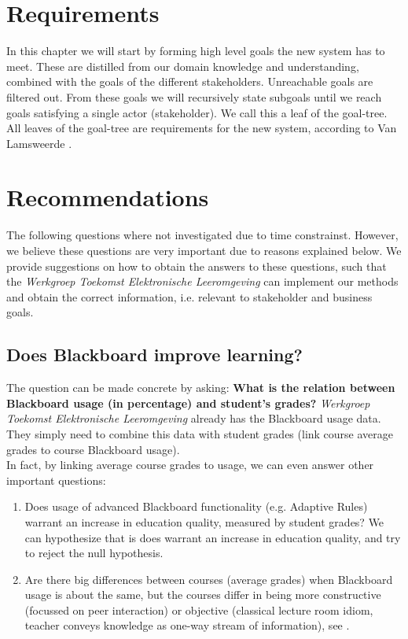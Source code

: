 \chapter{Requirements}
In this chapter we will start by forming high level goals the new system has to meet. These are distilled from our domain knowledge and understanding, combined with the goals of the different stakeholders. Unreachable goals are filtered out. From these goals we will recursively state subgoals until we reach goals satisfying a single actor (stakeholder). We call this a leaf of the goal-tree. All leaves of the goal-tree are requirements for the new system, according to Van Lamsweerde \cite{RE_book}.

\chapter{Recommendations}
The following questions where not investigated due to time constrainst. However, we believe these questions are very important due to reasons explained below. We provide suggestions on how to obtain the answers to these questions, such that the \textit{Werkgroep Toekomst Elektronische Leeromgeving} can implement our methods and obtain the correct information, i.e. relevant to stakeholder and business goals.

\section{Does Blackboard improve learning?}
The question can be made concrete by asking:\textbf{ What is the relation between Blackboard usage (in percentage) and student's grades?} \textit{Werkgroep Toekomst Elektronische Leeromgeving} already has the Blackboard usage data. They simply need to combine this data with student grades (link course average grades to course Blackboard usage). \\

In fact, by linking average course grades to usage, we can even answer other important questions:
\begin{enumerate}
	\item Does usage of advanced Blackboard functionality (e.g. Adaptive Rules) warrant an increase in education quality, measured by student grades? We can hypothesize that is does warrant an increase in education quality, and try to reject the null hypothesis.
	\item Are there big differences between courses (average grades) when Blackboard usage is about the same, but the courses differ in being more constructive (focussed on peer interaction) or objective (classical lecture room idiom, teacher conveys knowledge as one-way stream of information), see \cite{improveEducationWithIt}. 
\end{enumerate}

